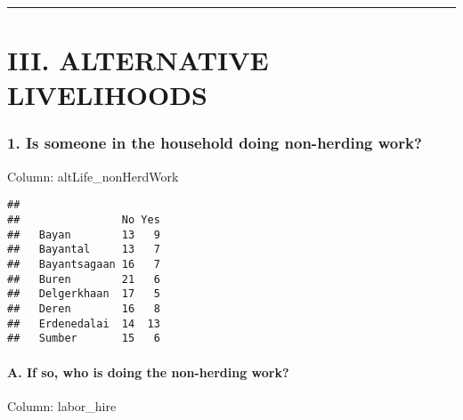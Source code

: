 \documentclass[
]{article}
\begin{document}
\begin{center}\rule{0.5\linewidth}{0.5pt}\end{center}

\section{III. ALTERNATIVE
LIVELIHOODS}\label{iii.-alternative-livelihoods}

\subsubsection{1. Is someone in the household doing non-herding
work?}\label{is-someone-in-the-household-doing-non-herding-work}

Column: altLife\_nonHerdWork

\begin{verbatim}
##               
##                No Yes
##   Bayan        13   9
##   Bayantal     13   7
##   Bayantsagaan 16   7
##   Buren        21   6
##   Delgerkhaan  17   5
##   Deren        16   8
##   Erdenedalai  14  13
##   Sumber       15   6
\end{verbatim}

\paragraph{A. If so, who is doing the non-herding
work?}\label{a.-if-so-who-is-doing-the-non-herding-work}

Column: labor\_hire
\end{document}
